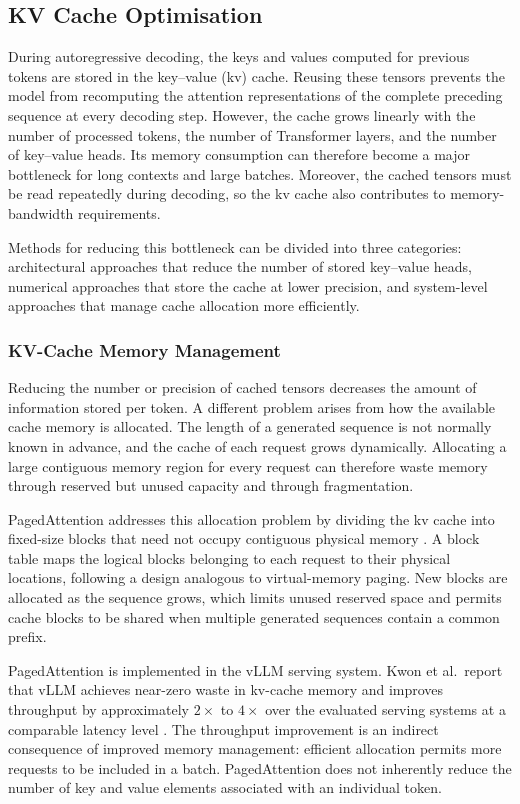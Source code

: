 \subsection{KV Cache Optimisation}\label{sec:kvcache_opt}

During autoregressive decoding, the keys and values computed for previous tokens
are stored in the key--value (\ac{kv}) cache. Reusing these tensors prevents the
model from recomputing the attention representations of the complete preceding
sequence at every decoding step. However, the cache grows linearly with the
number of processed tokens, the number of Transformer layers, and the number of
key--value heads. Its memory consumption can therefore become a major
bottleneck for long contexts and large batches. Moreover, the cached tensors
must be read repeatedly during decoding, so the \ac{kv} cache also contributes
to memory-bandwidth requirements.

Methods for reducing this bottleneck can be divided into three categories:
architectural approaches that reduce the number of stored key--value heads,
numerical approaches that store the cache at lower precision, and system-level
approaches that manage cache allocation more efficiently.


\subsubsection{KV-Cache Memory Management}

Reducing the number or precision of cached tensors decreases the amount of
information stored per token. A different problem arises from how the available
cache memory is allocated. The length of a generated sequence is not normally
known in advance, and the cache of each request grows dynamically. Allocating a
large contiguous memory region for every request can therefore waste memory
through reserved but unused capacity and through fragmentation.

PagedAttention addresses this allocation problem by dividing the \ac{kv} cache
into fixed-size blocks that need not occupy contiguous physical memory
\cite{kwon2023pagedattention}. A block table maps the logical blocks belonging
to each request to their physical locations, following a design analogous to
virtual-memory paging. New blocks are allocated as the sequence grows, which
limits unused reserved space and permits cache blocks to be shared when
multiple generated sequences contain a common prefix.

PagedAttention is implemented in the vLLM serving system. Kwon et al.\ report
that vLLM achieves near-zero waste in \ac{kv}-cache memory and improves
throughput by approximately \(2\times\) to \(4\times\) over the evaluated
serving systems at a comparable latency level
\cite{kwon2023pagedattention}. The throughput improvement is an indirect
consequence of improved memory management: efficient allocation permits more
requests to be included in a batch. PagedAttention does not inherently reduce
the number of key and value elements associated with an individual token.

